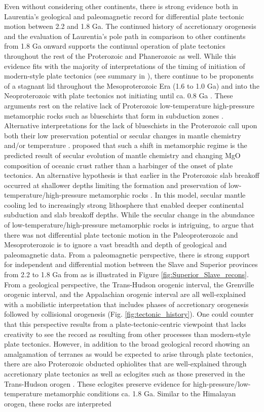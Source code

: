 \documentclass[twocolumn, switch]{article} %
\begin{document}
Even without considering other continents, there is strong evidence both in Laurentia's geological and paleomagnetic record for differential plate tectonic motion between 2.2 and 1.8 Ga. The continued history of accretionary orogenesis and the evaluation of Laurentia's pole path in comparison to other continents from 1.8 Ga onward supports the continual operation of plate tectonics throughout the rest of the Proterozoic and Phanerozoic as well. While this evidence fits with the majority of interpretations of the timing of initiation of modern-style plate tectonics (see summary in \citealp{Korenaga2013a}), there continue to be proponents of a stagnant lid throughout the Mesoproterozoic Era (1.6 to 1.0 Ga) and into the Neoproterozoic  with plate tectonics not initiating until ca. 0.8 Ga \citep{Hamilton2011a, Stern2018a}. These arguments rest on the relative lack of Proterozoic low-temperature high-pressure metamorphic rocks such as blueschists that form in subduction zones \citep{Stern2013a}. Alternative interpretations for the lack of blueschists in the Proterozoic call upon both their low preservation potential or secular changes in mantle chemistry and/or temperature \citep{Brown2019a}. \cite{Palin2015a} proposed that such a shift in metamorphic regime is the predicted result of secular evolution of mantle chemistry and changing MgO composition of oceanic crust rather than a harbinger of the onset of plate tectonics. An alternative hypothesis is that earlier in the Proterozoic slab breakoff occurred at shallower depths limiting the formation and preservation of low-temperature/high-pressure metamorphic rocks \citep{Brown2019a}. In this model, secular mantle cooling led to increasingly strong lithosphere that enabled deeper continental subduction and slab breakoff depths. While the secular change in the abundance of low-temperature/high-pressure metamorphic rocks is intriguing, to argue that there was not differential plate tectonic motion in the Paleoproterozoic and Mesoproterozoic is to ignore a vast breadth and depth of geological and paleomagnetic data. From a paleomagnetic perspective, there is strong support for independent and differential motion between the Slave and Superior provinces from 2.2 to 1.8 Ga from as is illustrated in Figure \ref{fig:Superior_Slave_recons}. From a geological perspective, the Trans-Hudson orogenic interval, the Grenville orogenic interval, and the Appalachian orogenic interval are all well-explained with a mobilistic interpretation that includes phases of accretionary orogenesis followed by collisional orogenesis (Fig. \ref{fig:tectonic_history}). One could counter that this perspective results from a plate-tectonic-centric viewpoint that lacks creativity to see the record as resulting from other processes than modern-style plate tectonics. However, in addition to the broad geological record showing an amalgamation of terranes as would be expected to arise through plate tectonics, there are also Proterozoic obducted ophiolites that are well-explained through accretionary plate tectonics as well as eclogites such as those preserved in the Trans-Hudson orogen \citep{Weller2017a}. These eclogites preserve evidence for high-pressure/low-temperature metamorphic conditions ca. 1.8 Ga. Similar to the Himalayan orogen, these rocks are interpreted 
\end{document}
